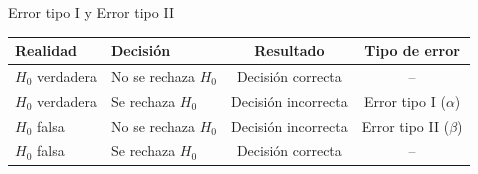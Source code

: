 \documentclass{beamer}
\begin{document}
\begin{frame}{Error tipo I y Error tipo II}

\begin{table}[h!]
\centering
\begin{tabular}{@{}llcc@{}}
\hline
\textbf{Realidad} & \textbf{Decisión} & \textbf{Resultado} & \textbf{Tipo de error} \\ \hline
$H_0$ verdadera & No se rechaza $H_0$ & Decisión correcta & -- \\
$H_0$ verdadera & Se rechaza $H_0$ & Decisión incorrecta & {\color{red}Error tipo I ($\alpha$) }\\
$H_0$ falsa     & No se rechaza $H_0$ & Decisión incorrecta & {\color{red}Error tipo II ($\beta$) }\\
$H_0$ falsa     & Se rechaza $H_0$    & Decisión correcta & -- \\
\hline
\end{tabular}
\end{table}


\end{frame}
\end{document}
